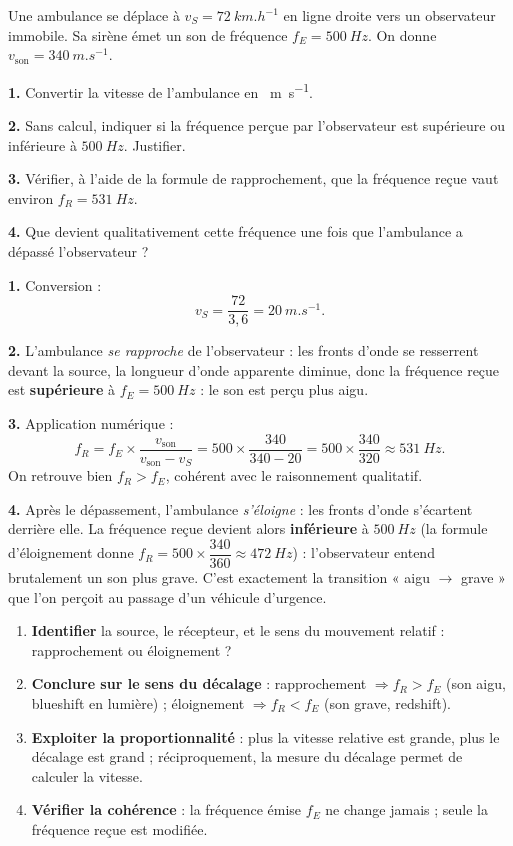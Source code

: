 \documentclass[11pt]{article}
\begin{document}
\begin{exoresolu}
Une ambulance se déplace à $v_S = \SI{72}{km.h^{-1}}$ en ligne droite vers un observateur immobile. Sa sirène émet un son de fréquence $f_E = \SI{500}{Hz}$. On donne $v_{\text{son}} = \SI{340}{m.s^{-1}}$.

\textbf{1.} Convertir la vitesse de l'ambulance en \SI{}{m.s^{-1}}.

\textbf{2.} Sans calcul, indiquer si la fréquence perçue par l'observateur est supérieure ou inférieure à $\SI{500}{Hz}$. Justifier.

\textbf{3.} Vérifier, à l'aide de la formule de rapprochement, que la fréquence reçue vaut environ $f_R = \SI{531}{Hz}$.

\textbf{4.} Que devient qualitativement cette fréquence une fois que l'ambulance a dépassé l'observateur ?

\tcblower
\textbf{1.} Conversion :
\[ v_S = \dfrac{72}{3{,}6} = \SI{20}{m.s^{-1}}. \]

\textbf{2.} L'ambulance \emph{se rapproche} de l'observateur : les fronts d'onde se resserrent devant la source, la longueur d'onde apparente diminue, donc la fréquence reçue est \textbf{supérieure} à $f_E = \SI{500}{Hz}$ : le son est perçu plus aigu.

\textbf{3.} Application numérique :
\[ f_R = f_E \times \dfrac{v_{\text{son}}}{v_{\text{son}} - v_S} = 500 \times \dfrac{340}{340 - 20} = 500 \times \dfrac{340}{320} \approx \SI{531}{Hz}. \]
On retrouve bien $f_R > f_E$, cohérent avec le raisonnement qualitatif.

\textbf{4.} Après le dépassement, l'ambulance \emph{s'éloigne} : les fronts d'onde s'écartent derrière elle. La fréquence reçue devient alors \textbf{inférieure} à $\SI{500}{Hz}$ (la formule d'éloignement donne $f_R = 500 \times \dfrac{340}{360} \approx \SI{472}{Hz}$) : l'observateur entend brutalement un son plus grave. C'est exactement la transition « aigu $\to$ grave » que l'on perçoit au passage d'un véhicule d'urgence.
\end{exoresolu}

\begin{methode}
\begin{enumerate}
\item \textbf{Identifier} la source, le récepteur, et le sens du mouvement relatif : rapprochement ou éloignement ?
\item \textbf{Conclure sur le sens du décalage} : rapprochement $\Rightarrow f_R > f_E$ (son aigu, blueshift en lumière) ; éloignement $\Rightarrow f_R < f_E$ (son grave, redshift).
\item \textbf{Exploiter la proportionnalité} : plus la vitesse relative est grande, plus le décalage est grand ; réciproquement, la mesure du décalage permet de calculer la vitesse.
\item \textbf{Vérifier la cohérence} : la fréquence émise $f_E$ ne change jamais ; seule la fréquence reçue est modifiée.
\end{enumerate}
\end{methode}
\end{document}
